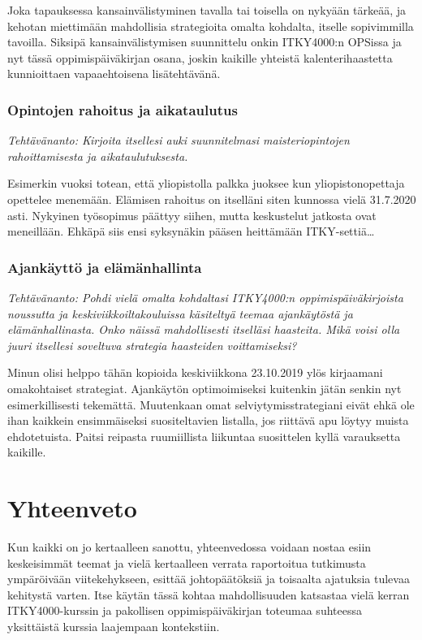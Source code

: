\documentclass[utf8]{gradu3}
\begin{document}
Joka tapauksessa kansainvälistyminen tavalla tai toisella on nykyään
tärkeää, ja kehotan miettimään mahdollisia strategioita omalta
kohdalta, itselle sopivimmilla tavoilla. Siksipä kansainvälistymisen
suunnittelu onkin ITKY4000:n OPSissa ja nyt tässä oppimispäiväkirjan
osana, joskin kaikille yhteistä kalenterihaastetta kunnioittaen
vapaaehtoisena lisätehtävänä.

\subsection{Opintojen rahoitus ja aikataulutus}

\textit{Tehtävänanto: Kirjoita itsellesi auki suunnitelmasi
  maisteriopintojen rahoittamisesta ja aikataulutuksesta.}

Esimerkin vuoksi totean, että yliopistolla palkka juoksee kun
yliopistonopettaja opettelee menemään. Elämisen rahoitus on itselläni
siten kunnossa vielä 31.7.2020 asti. Nykyinen työsopimus päättyy
siihen, mutta keskustelut jatkosta ovat meneillään. Ehkäpä siis ensi
syksynäkin pääsen heittämään ITKY-settiä\ldots

\subsection{Ajankäyttö ja elämänhallinta}

\textit{Tehtävänanto: Pohdi vielä omalta kohdaltasi ITKY4000:n
  oppimispäiväkirjoista noussutta ja keskiviikkoiltakouluissa
  käsiteltyä teemaa ajankäytöstä ja elämänhallinasta. Onko näissä
  mahdollisesti itselläsi haasteita. Mikä voisi olla juuri itsellesi
  soveltuva strategia haasteiden voittamiseksi?}

Minun olisi helppo tähän kopioida keskiviikkona 23.10.2019 ylös
kirjaamani omakohtaiset strategiat. Ajankäytön optimoimiseksi
kuitenkin jätän senkin nyt esimerkillisesti tekemättä. Muutenkaan omat
selviytymisstrategiani eivät ehkä ole ihan kaikkein ensimmäiseksi
suositeltavien listalla, jos riittävä apu löytyy muista
ehdotetuista. Paitsi reipasta ruumiillista liikuntaa suosittelen kyllä
varauksetta kaikille.


\chapter{Yhteenveto}
\label{yhteenveto}

Kun kaikki on jo kertaalleen sanottu, yhteenvedossa voidaan nostaa
esiin keskeisimmät teemat ja vielä kertaalleen verrata raportoitua
tutkimusta ympäröivään viitekehykseen, esittää johtopäätöksiä ja
toisaalta ajatuksia tulevaa kehitystä varten. Itse käytän tässä kohtaa
mahdollisuuden katsastaa vielä kerran ITKY4000-kurssin ja pakollisen
oppimispäiväkirjan toteumaa suhteessa yksittäistä kurssia laajempaan
kontekstiin.
\end{document}
